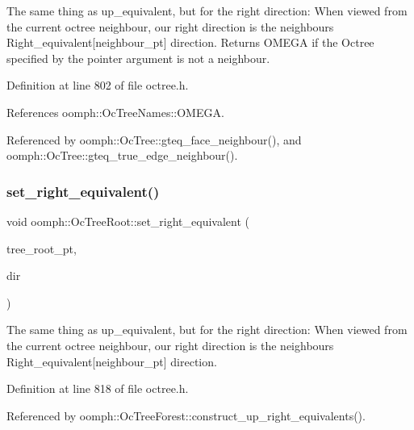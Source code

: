 The same thing as up\+\_\+equivalent, but for the right direction\+: When viewed from the current octree neighbour, our right direction is the neighbour\textquotesingle{}s Right\+\_\+equivalent\mbox{[}neighbour\+\_\+pt\mbox{]} direction. Returns O\+M\+E\+GA if the Octree specified by the pointer argument is not a neighbour. 



Definition at line 802 of file octree.\+h.



References oomph\+::\+Oc\+Tree\+Names\+::\+O\+M\+E\+GA.



Referenced by oomph\+::\+Oc\+Tree\+::gteq\+\_\+face\+\_\+neighbour(), and oomph\+::\+Oc\+Tree\+::gteq\+\_\+true\+\_\+edge\+\_\+neighbour().

\mbox{\label{classoomph_1_1OcTreeRoot_aa462fe159838307aee0870ad089836f5}} 
\subsubsection{\texorpdfstring{set\+\_\+right\+\_\+equivalent()}{set\_right\_equivalent()}}
{\footnotesize\ttfamily void oomph\+::\+Oc\+Tree\+Root\+::set\+\_\+right\+\_\+equivalent (\begin{DoxyParamCaption}\item[{\hyperlink{classoomph_1_1TreeRoot}{Tree\+Root} $\ast$}]{tree\+\_\+root\+\_\+pt,  }\item[{const int \&}]{dir }\end{DoxyParamCaption})\hspace{0.3cm}{\ttfamily [inline]}}



The same thing as up\+\_\+equivalent, but for the right direction\+: When viewed from the current octree neighbour, our right direction is the neighbour\textquotesingle{}s Right\+\_\+equivalent\mbox{[}neighbour\+\_\+pt\mbox{]} direction. 



Definition at line 818 of file octree.\+h.



Referenced by oomph\+::\+Oc\+Tree\+Forest\+::construct\+\_\+up\+\_\+right\+\_\+equivalents().

